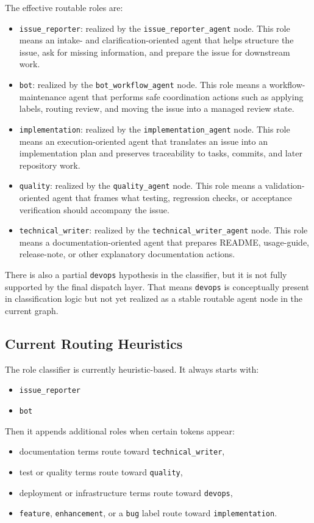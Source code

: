 \documentclass[11pt,a4paper]{article}
\begin{document}
The effective routable roles are:
\begin{itemize}
    \item \texttt{issue\_reporter}: realized by the \texttt{issue\_reporter\_agent} node. This role means an intake- and clarification-oriented agent that helps structure the issue, ask for missing information, and prepare the issue for downstream work.
    \item \texttt{bot}: realized by the \texttt{bot\_workflow\_agent} node. This role means a workflow-maintenance agent that performs safe coordination actions such as applying labels, routing review, and moving the issue into a managed review state.
    \item \texttt{implementation}: realized by the \texttt{implementation\_agent} node. This role means an execution-oriented agent that translates an issue into an implementation plan and preserves traceability to tasks, commits, and later repository work.
    \item \texttt{quality}: realized by the \texttt{quality\_agent} node. This role means a validation-oriented agent that frames what testing, regression checks, or acceptance verification should accompany the issue.
    \item \texttt{technical\_writer}: realized by the \texttt{technical\_writer\_agent} node. This role means a documentation-oriented agent that prepares README, usage-guide, release-note, or other explanatory documentation actions.
\end{itemize}

There is also a partial \texttt{devops} hypothesis in the classifier, but it is not fully supported by the final dispatch layer. That means \texttt{devops} is conceptually present in classification logic but not yet realized as a stable routable agent node in the current graph.

\subsection{Current Routing Heuristics}

The role classifier is currently heuristic-based. It always starts with:
\begin{itemize}
    \item \texttt{issue\_reporter}
    \item \texttt{bot}
\end{itemize}

Then it appends additional roles when certain tokens appear:
\begin{itemize}
    \item documentation terms route toward \texttt{technical\_writer},
    \item test or quality terms route toward \texttt{quality},
    \item deployment or infrastructure terms route toward \texttt{devops},
    \item \texttt{feature}, \texttt{enhancement}, or a \texttt{bug} label route toward \texttt{implementation}.
\end{itemize}
\end{document}
